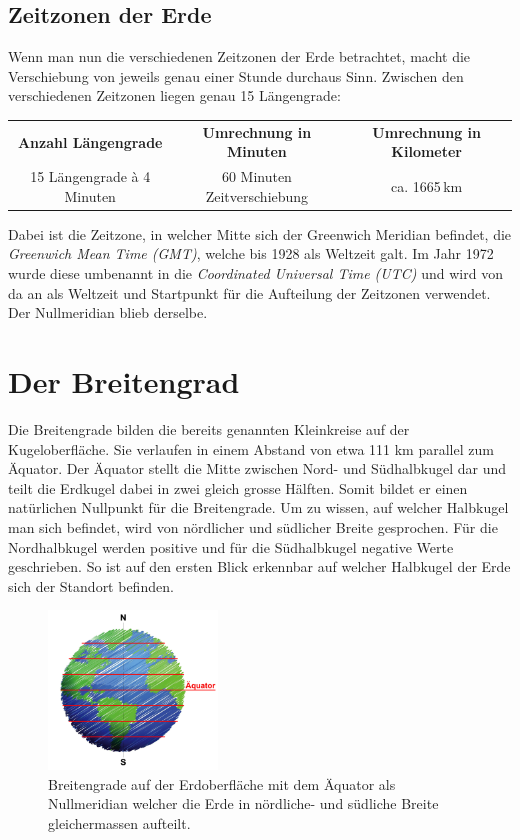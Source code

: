 \begin{refsection}
\subsection{Zeitzonen der Erde} \label{Zeitzonen} 
Wenn man nun die verschiedenen Zeitzonen der Erde betrachtet, macht
die Verschiebung von jeweils genau einer Stunde durchaus Sinn.
Zwischen den verschiedenen Zeitzonen liegen genau 15 Längengrade:
\begin{center}
\renewcommand{\arraystretch}{1.5}
\begin{tabular}{ccc}
\textbf{Anzahl Längengrade} & \textbf{Umrechnung in Minuten} & \textbf{Umrechnung in Kilometer}  \\
15 Längengrade à 4 Minuten & 60 Minuten Zeitverschiebung & ca. 1665\,km \\
\end{tabular}
\end{center}

Dabei ist die Zeitzone, in welcher Mitte sich der Greenwich Meridian
befindet, die {\em Greenwich Mean Time (GMT)}, welche bis 1928 als
Weltzeit galt. Im Jahr 1972 wurde diese umbenannt in die {\em
Coordinated Universal Time (UTC)} und wird von da an als Weltzeit
und Startpunkt für die Aufteilung der Zeitzonen verwendet. Der
Nullmeridian blieb derselbe.


\section{Der Breitengrad}
Die Breitengrade bilden die bereits genannten Kleinkreise auf der
Kugeloberfläche. Sie verlaufen in einem Abstand von etwa 111 km
parallel zum Äquator. Der Äquator stellt die Mitte zwischen Nord-
und Südhalbkugel dar und teilt die Erdkugel dabei in zwei gleich
grosse Hälften. Somit bildet er einen natürlichen Nullpunkt für die
Breitengrade.
Um zu wissen, auf welcher Halbkugel man sich befindet, wird von
nördlicher und südlicher Breite gesprochen. Für die Nordhalbkugel
werden positive und für die Südhalbkugel negative Werte geschrieben.
So ist auf den ersten Blick erkennbar auf welcher Halbkugel der
Erde sich der Standort befinden.

\begin{figure}[htbp]
\centering
\includegraphics[width=0.4\textwidth]{kugel/BreiteErdkugel.jpg}
\caption{Breitengrade auf der Erdoberfläche mit dem Äquator als
Nullmeridian welcher die Erde in nördliche- und südliche Breite
gleichermassen aufteilt.}
\end{figure}




\end{refsection}
